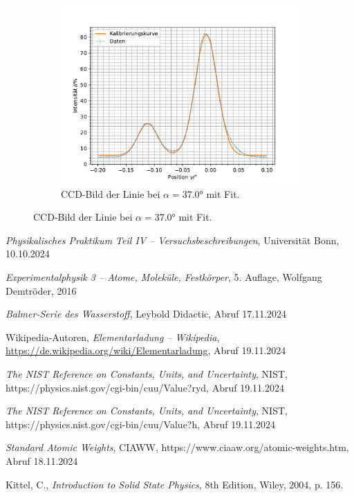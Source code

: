\documentclass{article}
\begin{document}
\begin{figure}[h!]
  \begin{subfigure}{0.49\textwidth}
    \includegraphics[width=\textwidth]{line37.0.pdf}
    \caption{CCD-Bild der Linie bei $\alpha=\ang{37.0}$ mit Fit.}
  \end{subfigure}
  \caption{CCD-Bild der Linie bei $\alpha=\ang{37.0}$ mit Fit.}
  \label{fig:gauss-fit}
\end{figure}


\clearpage
\begin{thebibliography}{9}

\textit{Physikalisches Praktikum Teil IV -- Versuchsbeschreibungen}, Universität Bonn, 10.10.2024

\textit{Experimentalphysik 3 -- Atome, Moleküle, Festkörper}, 5. Auflage, Wolfgang Demtröder, 2016

\textit{Balmer-Serie des Wasserstoff}, Leybold Didactic, Abruf 17.11.2024

Wikipedia-Autoren, \textit{Elementarladung -- Wikipedia}, \url{https://de.wikipedia.org/wiki/Elementarladung}, Abruf 19.11.2024

\textit{The NIST Reference on Constants, Units, and Uncertainty}, NIST, https://physics.nist.gov/cgi-bin/cuu/Value?ryd, Abruf 19.11.2024

\textit{The NIST Reference on Constants, Units, and Uncertainty}, NIST, https://physics.nist.gov/cgi-bin/cuu/Value?h, Abruf 19.11.2024

\textit{Standard Atomic Weights}, CIAWW, https://www.ciaaw.org/atomic-weights.htm, Abruf 18.11.2024

Kittel, C., \textit{Introduction to Solid State Physics}, 8th Edition, Wiley, 2004, p. 156.

\end{thebibliography}
\end{document}
